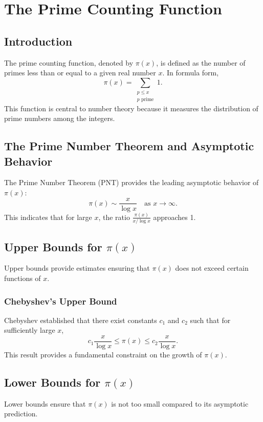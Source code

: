 \chapter{The Prime Counting Function}
\label{chap:prime_counting_function}

\unintegrated

\section{Introduction}
The prime counting function, denoted by $\pi(x)$, is defined as the number of primes less than or equal to a given real number $x$. In formula form,
\[
\pi(x) = \sum_{\substack{p \le x \\ p \text{ prime}}} 1.
\]
This function is central to number theory because it measures the distribution of prime numbers among the integers.

\section{The Prime Number Theorem and Asymptotic Behavior}
The Prime Number Theorem (PNT) provides the leading asymptotic behavior of $\pi(x)$:
\[
\pi(x) \sim \frac{x}{\log x} \quad \text{as } x \to \infty.
\]
This indicates that for large $x$, the ratio $\frac{\pi(x)}{x/\log x}$ approaches 1.

\section{Upper Bounds for \texorpdfstring{$\pi(x)$}{pi(x)}}
Upper bounds provide estimates ensuring that $\pi(x)$ does not exceed certain functions of $x$.

\subsection{Chebyshev's Upper Bound}
Chebyshev established that there exist constants \(c_1\) and \(c_2\) such that for sufficiently large \(x\),
\[
c_1 \frac{x}{\log x} \leq \pi(x) \leq c_2 \frac{x}{\log x}.
\]
This result provides a fundamental constraint on the growth of $\pi(x)$.

\section{Lower Bounds for \texorpdfstring{$\pi(x)$}{pi(x)}}
Lower bounds ensure that $\pi(x)$ is not too small compared to its asymptotic prediction.

